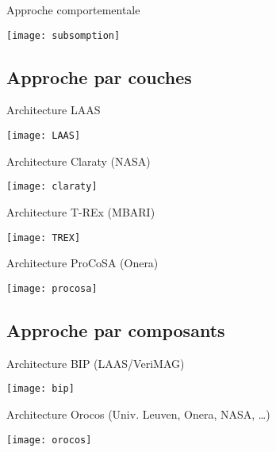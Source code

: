 \documentclass[compress]{beamer}
\begin{document}
\begin{frame}{Approche comportementale}
\begin{center}
\texttt{[image: subsomption]}
\end{center}
\end{frame}

\subsection{Approche par couches}

\begin{frame}{Architecture LAAS}
\begin{center}
\texttt{[image: LAAS]}
\end{center}
\end{frame}

\begin{frame}{Architecture Claraty (NASA)}
\begin{center}
\texttt{[image: claraty]}
\end{center}
\end{frame}

\begin{frame}{Architecture T-REx (MBARI)}
\begin{center}
\texttt{[image: TREX]}
\end{center}
\end{frame}

\begin{frame}{Architecture ProCoSA (Onera)}
\begin{center}
\texttt{[image: procosa]}
\end{center}
\end{frame}

\subsection{Approche par composants}
\begin{frame}{Architecture BIP (LAAS/VeriMAG)}
\begin{center}
\texttt{[image: bip]}
\end{center}
\end{frame}
\begin{frame}{Architecture Orocos (Univ. Leuven, Onera, NASA, \dots)}
\begin{center}
\texttt{[image: orocos]}
\end{center}
\end{frame}
\end{document}
